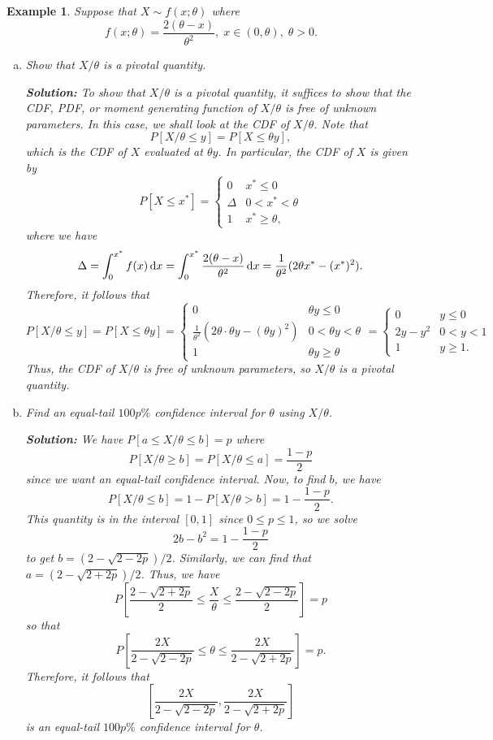 \documentclass[10pt]{article}
\newcommand{\dd}{\,{\rm d}}
\theoremstyle{newstyle}
\newtheorem{exmp}[thm]{Example}
\begin{document}
\begin{exmp}
Suppose that $X \sim f(x; \theta)$ where 
\[ f(x; \theta) = \frac{2(\theta - x)}{\theta^2}, \; x \in (0, \theta),\; \theta > 0. \]
\begin{enumerate}[(a)]
    \item Show that $X/\theta$ is a pivotal quantity. 
    
    {\color{blue} 
    {\bf Solution:}
    To show that $X/\theta$ is a pivotal quantity, it suffices to show that the CDF, 
    PDF, or moment generating function of $X/\theta$ is free of unknown parameters. 
    In this case, we shall look at the CDF of $X/\theta$. Note that 
    \[ P[X/\theta \leq y] = P[X \leq \theta y], \]
    which is the CDF of $X$ evaluated at $\theta y$. In particular, the CDF of $X$ is given by 
    \[ P[X \leq x^*] = \begin{cases} 0 & x^* \leq 0 \\ 
    \Delta & 0 < x^* < \theta \\ 1 & x^* \geq \theta, \end{cases} \] 
    where we have 
    \[ \Delta = \int_0^{x^*} f(x)\dd x = \int_0^{x^*} \frac{2(\theta - x)}{\theta^2}\dd x 
    = \frac{1}{\theta^2} (2\theta x^* - (x^*)^2). \] 
    Therefore, it follows that 
    \[ P[X/\theta \leq y] = P[X \leq \theta y] 
    = \begin{cases} 0 & \theta y \leq 0 \\ \frac1{\theta^2} (2\theta \cdot \theta y - (\theta y)^2) 
    & 0 < \theta y < \theta \\ 1 & \theta y \geq \theta \end{cases} 
    = \begin{cases} 
    0 & y \leq 0 \\
    2y - y^2 & 0 < y < 1 \\
    1 & y \geq 1. \end{cases} \]
    Thus, the CDF of $X/\theta$ is free of unknown parameters, so $X/\theta$ is a pivotal quantity.}
    
    \item Find an equal-tail $100p\%$ confidence interval for $\theta$ using $X/\theta$. 
    
    {\color{blue} 
    {\bf Solution:}
    We have $P[a \leq X/\theta \leq b] = p$ where 
    \[ P[X/\theta \geq b] = P[X/\theta \leq a] = \frac{1-p}2 \] 
    since we want an equal-tail confidence interval. Now, to find $b$, we have 
    \[ P[X/\theta \leq b] = 1 - P[X/\theta > b] = 1 - \frac{1-p}2. \]
    This quantity is in the interval $[0, 1]$ since $0 \leq p \leq 1$, so we solve 
    \[ 2b - b^2 = 1 - \frac{1-p}2 \]
    to get $b = (2 - \sqrt{2-2p})/2$. Similarly, we can find that 
    $a = (2 - \sqrt{2+2p})/2$. Thus, we have 
    \[ P \left[ \frac{2 - \sqrt{2+2p}}2 \leq \frac X\theta \leq \frac{2 - \sqrt{2-2p}}2 
    \right] = p \]
    so that 
    \[ P \left[ \frac{2X}{2 - \sqrt{2-2p}} \leq \theta \leq \frac{2X}{2 - \sqrt{2+2p}} \right] = p. \]
    Therefore, it follows that 
    \[ \left[ \frac{2X}{2 - \sqrt{2-2p}}, \frac{2X}{2 - \sqrt{2+2p}} \right] \]
    is an equal-tail $100p\%$ confidence interval for $\theta$. 
    }
\end{enumerate}
\end{exmp}
\end{document}
